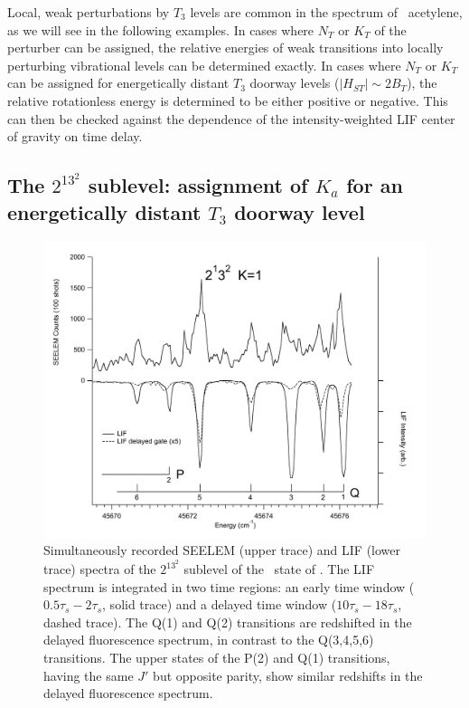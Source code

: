 Local, weak perturbations by $T_3$ levels are common in the spectrum
of \astate\ acetylene, as we will see in the following examples.  In
cases where $N_T$ or $K_T$ of the perturber can be assigned, the
relative energies of weak transitions into locally perturbing
vibrational levels can be determined exactly.  In cases where $N_T$ or
$K_T$ can be assigned for energetically distant $T_3$ doorway levels
($\lvert H_{ST} \rvert \sim 2B_T$), the relative rotationless energy
is determined to be either positive or negative.  This can then be
checked against the dependence of the intensity-weighted LIF center of
gravity on time delay.

\subsection{The $2^13^2$  sublevel: assignment of $K_a$ for an
  energetically distant $T_3$ doorway level}



\begin{figure}
  \caption{Simultaneously recorded SEELEM (upper trace) and LIF (lower
    trace) spectra of the $2^13^2$  sublevel of the \astate\
    state of .  The LIF spectrum is integrated in two time
    regions: an early time window ($0.5\tau_s-2\tau_s$, solid trace)
    and a delayed time window ($10\tau_s-18\tau_s$, dashed trace).
    The Q(1) and Q(2) transitions are redshifted in the delayed
    fluorescence spectrum, in contrast to the Q(3,4,5,6) transitions.
    The upper states of the P(2) and Q(1) transitions, having the same
    $J'$ but opposite parity, show similar redshifts in the delayed
    fluorescence spectrum.}
  \label{fig:spectrum-2132}
  \centering
  \vspace{1cm}
  \includegraphics[width=7in,angle=90]{spectrum-2132-q6q1.pdf}
\end{figure}

